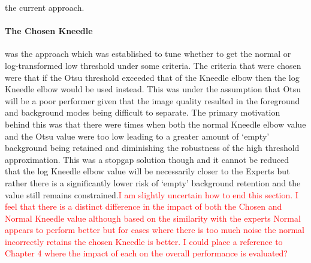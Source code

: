 the current approach.\paragraph{The Chosen Kneedle} was the approach which was established to tune whether to get the normal or log-transformed low threshold under some criteria. The criteria that were chosen were that if the Otsu threshold exceeded that of the Kneedle elbow then the log Kneedle elbow would be used instead. This was under the assumption that Otsu will be a poor performer given that the image quality resulted in the foreground and background modes being difficult to separate. The primary motivation behind this was that there were times when both the normal Kneedle elbow value and the Otsu value were too low leading to a greater amount of `empty' background being retained and diminishing the robustness of the high threshold approximation. This was a stopgap solution though and it cannot be reduced that the log Kneedle elbow value will be necessarily closer to the Experts but rather there is a significantly lower risk of `empty' background retention and the value still remains constrained.\textcolor{red}{I am slightly uncertain how to end this section. I feel that there is a distinct difference in the impact of both the Chosen and Normal Kneedle value although based on the similarity with the experts Normal appears to perform better but for cases where there is too much noise the normal incorrectly retains the chosen Kneedle is better. I could place a reference to Chapter 4 where the impact of each on the overall performance is evaluated?}
\iffalse
